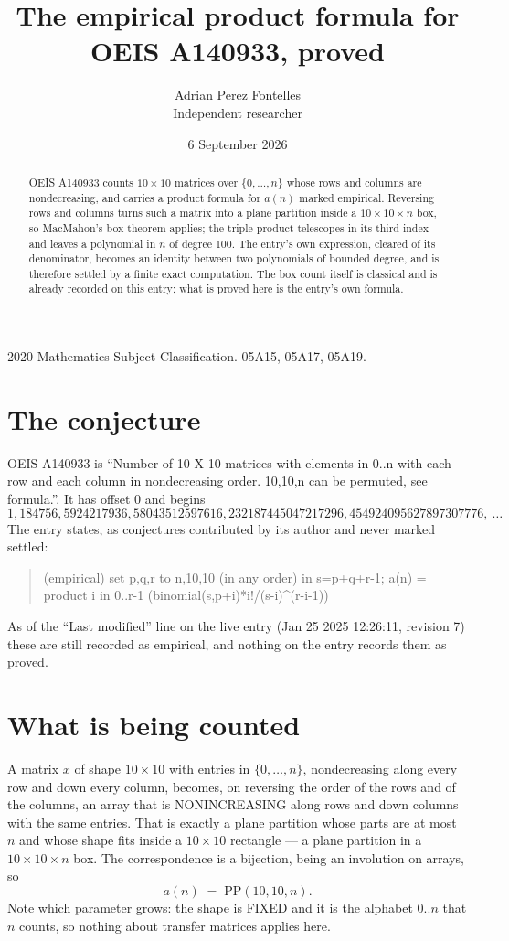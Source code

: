 \documentclass[11pt,a4paper]{article}
\title{The empirical product formula for OEIS A140933, proved}
\author{Adrian Perez Fontelles\\ \small Independent researcher}
\date{6 September 2026}
\theoremstyle{plain}
\theoremstyle{definition}
\begin{document}
\maketitle

\begin{abstract}
OEIS A140933 counts $10\times10$ matrices over $\{0,\dots,n\}$ whose rows and columns are
nondecreasing, and carries a product formula for $a(n)$ marked empirical. Reversing rows and
columns turns such a matrix into a plane partition inside a $10\times10\times n$ box, so
MacMahon's box theorem applies; the triple product telescopes in its third index and leaves a
polynomial in $n$ of degree $100$. The entry's own expression, cleared of its denominator,
becomes an identity between two polynomials of bounded degree, and is therefore settled by a
finite exact computation. The box count itself is classical and is already recorded on this
entry; what is proved here is the entry's own formula.
\end{abstract}

\noindent\small 2020 Mathematics Subject Classification. 05A15, 05A17, 05A19.\normalsize

\section{The conjecture}

OEIS A140933 is ``Number of 10 X 10 matrices with elements in 0..n with each row and each column in nondecreasing order. 10,10,n can be permuted, see formula.''. It has offset $0$ and begins
\[
1, 184756, 5924217936, 58043512597616, 232187445047217296, 454924095627897307776,\ \dots
\]
The entry states, as conjectures contributed by its author and never marked settled:
\begin{quote}
(empirical) set p,q,r to n,10,10 (in any order) in s=p+q+r-1; a(n) = product {i in 0..r-1} (binomial(s,p+i)*i!/(s-i)\^{}(r-i-1))

\end{quote}
As of the ``Last modified'' line on the live entry (Jan 25 2025 12:26:11, revision 7) these are still
recorded as empirical, and nothing on the entry records them as proved.

\section{What is being counted}

A matrix $x$ of shape $10\times10$ with entries in $\{0,\dots,n\}$, nondecreasing along
every row and down every column, becomes, on reversing the order of the rows and of the
columns, an array that is NONINCREASING along rows and down columns with the same entries. That
is exactly a plane partition whose parts are at most $n$ and whose shape fits inside a
$10\times10$ rectangle --- a plane partition in a $10\times10\times n$ box. The
correspondence is a bijection, being an involution on arrays, so
\[
a(n)\;=\;\mathrm{PP}(10,10,n).
\]
Note which parameter grows: the shape is FIXED and it is the alphabet $0..n$ that $n$ counts,
so nothing about transfer matrices applies here.
\end{document}
